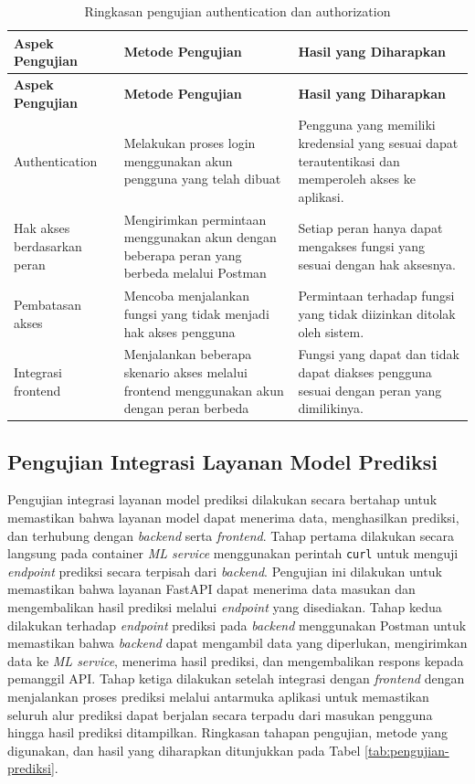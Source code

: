 \begin{longtable}{|p{3.2cm}|p{4.0cm}|p{4.0cm}|}
    \caption{Ringkasan pengujian authentication dan authorization}
    \label{tab:pengujian-auth} \\
    \hline
    \textbf{Aspek Pengujian} & \textbf{Metode Pengujian} & \textbf{Hasil yang Diharapkan} \\
    \hline
    \endfirsthead
    
    \hline
    \textbf{Aspek Pengujian} & \textbf{Metode Pengujian} & \textbf{Hasil yang Diharapkan} \\
    \hline
    \endhead
    
    Authentication &
    Melakukan proses login menggunakan akun pengguna yang telah dibuat &
    Pengguna yang memiliki kredensial yang sesuai dapat terautentikasi dan memperoleh akses ke aplikasi. \\
    \hline
    Hak akses berdasarkan peran &
    Mengirimkan permintaan menggunakan akun dengan beberapa peran yang berbeda melalui Postman &
    Setiap peran hanya dapat mengakses fungsi yang sesuai dengan hak aksesnya. \\
    \hline
    Pembatasan akses &
    Mencoba menjalankan fungsi yang tidak menjadi hak akses pengguna &
    Permintaan terhadap fungsi yang tidak diizinkan ditolak oleh sistem. \\
    \hline
    Integrasi frontend &
    Menjalankan beberapa skenario akses melalui frontend menggunakan akun dengan peran berbeda &
    Fungsi yang dapat dan tidak dapat diakses pengguna sesuai dengan peran yang dimilikinya. \\
    \hline
\end{longtable}

\subsection{Pengujian Integrasi Layanan Model Prediksi}

Pengujian integrasi layanan model prediksi dilakukan secara bertahap untuk memastikan bahwa layanan model dapat menerima data, menghasilkan prediksi, dan terhubung dengan \textit{backend} serta \textit{frontend}. Tahap pertama dilakukan secara langsung pada container \textit{ML service} menggunakan perintah \texttt{curl} untuk menguji \textit{endpoint} prediksi secara terpisah dari \textit{backend}. Pengujian ini dilakukan untuk memastikan bahwa layanan FastAPI dapat menerima data masukan dan mengembalikan hasil prediksi melalui \textit{endpoint} yang disediakan. Tahap kedua dilakukan terhadap \textit{endpoint} prediksi pada \textit{backend} menggunakan Postman untuk memastikan bahwa \textit{backend} dapat mengambil data yang diperlukan, mengirimkan data ke \textit{ML service}, menerima hasil prediksi, dan mengembalikan respons kepada pemanggil API. Tahap ketiga dilakukan setelah integrasi dengan \textit{frontend} dengan menjalankan proses prediksi melalui antarmuka aplikasi untuk memastikan seluruh alur prediksi dapat berjalan secara terpadu dari masukan pengguna hingga hasil prediksi ditampilkan. Ringkasan tahapan pengujian, metode yang digunakan, dan hasil yang diharapkan ditunjukkan pada Tabel \ref{tab:pengujian-prediksi}.

